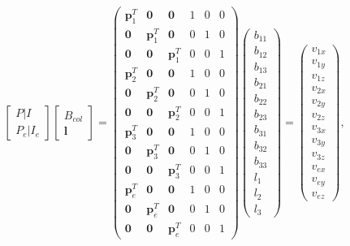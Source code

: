 \documentclass[12pt]{article}
\begin{document}
\begin{equation*}
\begin{bmatrix} P | I \\ P_e | I_e \end{bmatrix} \begin{bmatrix}  B_{col} \\ \mathbf{l} \end{bmatrix} = 
\begin{pmatrix}
 \mathbf{p}_1^T & \mathbf{0} & \mathbf{0} & 1 & 0 & 0\\ 
 \mathbf{0} & \mathbf{p}_1^T & \mathbf{0} & 0 & 1 & 0\\ 
 \mathbf{0} & \mathbf{0} & \mathbf{p}_1^T & 0 & 0 & 1\\
  \mathbf{p}_2^T & \mathbf{0} & \mathbf{0} & 1 & 0 & 0\\ 
 \mathbf{0} & \mathbf{p}_2^T & \mathbf{0} & 0 & 1 & 0\\ 
 \mathbf{0} & \mathbf{0} & \mathbf{p}_2^T & 0 & 0 & 1\\
  \mathbf{p}_3^T & \mathbf{0} & \mathbf{0} & 1 & 0 & 0\\ 
 \mathbf{0} & \mathbf{p}_3^T & \mathbf{0} & 0 & 1 & 0\\ 
 \mathbf{0} & \mathbf{0} & \mathbf{p}_3^T & 0 & 0 & 1 \\
   \mathbf{p}_e^T & \mathbf{0} & \mathbf{0} & 1 & 0 & 0\\ 
 \mathbf{0} & \mathbf{p}_e^T & \mathbf{0} & 0 & 1 & 0\\ 
 \mathbf{0} & \mathbf{0} & \mathbf{p}_e^T & 0 & 0 & 1
\end{pmatrix}
\begin{pmatrix}
b_{11} \\
b_{12} \\
b_{13} \\
b_{21} \\
b_{22} \\
b_{23} \\
b_{31} \\
b_{32} \\
b_{33} \\
l_{1} \\
l_{2} \\
l_{3}
\end{pmatrix} =
\begin{pmatrix} 
v_{1x} \\
v_{1y} \\
v_{1z} \\
v_{2x} \\
v_{2y} \\
v_{2z} \\
v_{3x} \\
v_{3y} \\
v_{3z} \\
v_{ex} \\
v_{ey} \\
v_{ez}
\end{pmatrix},
\end{equation*}
\end{document}
